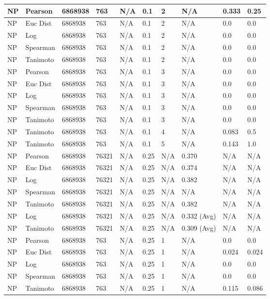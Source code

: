 \documentclass{article}
\begin{document}
\begin{longtable}{ |p{1.7cm}|p{1.9cm}|p{1.5cm}|p{1.5cm}|p{0.75cm}|p{0.75cm}|p{0.75cm}|p{0.75cm}|p{1.5cm}|p{1.5cm}|}
    NP & Pearson & 6868938 & 763 & N/A &  0.1 & 2 & N/A & 0.333 & 0.25  \\ \hline
    NP & Euc Dist & 6868938 & 763 & N/A &  0.1 &  2 & N/A &0.0 & 0.0   \\ \hline
    NP & Log & 6868938 & 763 & N/A &  0.1 &  2 & N/A & 0.0 & 0.0 \\ \hline
    NP & Spearman & 6868938 & 763 & N/A &  0.1 &  2 & N/A & 0.0 & 0.0 \\ \hline
    NP & Tanimoto & 6868938 & 763 & N/A &  0.1 &  2 & N/A & 0.0 & 0.0 \\ \hline
    
    NP & Pearson & 6868938 & 763 & N/A &  0.1 & 3 & N/A & 0.0 & 0.0  \\ \hline
    NP & Euc Dist & 6868938 & 763 & N/A &  0.1 & 3  & N/A &0.0 & 0.0   \\ \hline
    NP & Log & 6868938 & 763 & N/A &  0.1 & 3  & N/A & 0.0 & 0.0  \\ \hline
    NP & Spearman & 6868938 & 763 & N/A &  0.1 & 3  & N/A &0.0 & 0.0 \\ \hline
    NP & Tanimoto & 6868938 & 763 & N/A &  0.1 & 3 & N/A & 0.0 & 0.0 \\ \hline
    NP & Tanimoto & 6868938 & 763 & N/A &  0.1 &  4 & N/A & 0.083 & 0.5 \\ \hline
    NP & Tanimoto & 6868938 & 763 & N/A &  0.1 &  5 & N/A & 0.143 & 1.0 \\ \hline
    
    NP & Pearson & 6868938 & 76321 & N/A &  0.25 & N/A & 0.370 & N/A & N/A  \\ \hline
    NP & Euc Dist & 6868938 & 76321 & N/A &  0.25 & N/A & 0.374 & N/A & N/A   \\ \hline
    NP & Log & 6868938 & 76321 & N/A &  0.25 & N/A & 0.382 & N/A & N/A  \\ \hline
    NP & Spearman & 6868938 & 76321 & N/A &  0.25 & N/A & N/A & N/A & N/A \\ \hline
    NP & Tanimoto & 6868938 & 76321 & N/A &  0.25 & N/A & 0.382 & N/A & N/A \\ \hline
    NP & Log & 6868938 & 76321 & N/A &  0.25 & N/A & 0.332 (Avg) & N/A & N/A \\ \hline
    NP & Tanimoto & 6868938 & 76321 & N/A &  0.25 & N/A & 0.309 (Avg) & N/A & N/A \\ \hline
    
    NP & Pearson & 6868938 & 763 & N/A &  0.25 & 1 & N/A & 0.0 & 0.0  \\ \hline
    NP & Euc Dist & 6868938 & 763 & N/A &  0.25 & 1 & N/A &0.024 & 0.024   \\ \hline
    NP & Log & 6868938 & 763 & N/A &  0.25 & 1 & N/A & 0.0 & 0.0  \\ \hline
    NP & Spearman & 6868938 & 763 & N/A &  0.25 & 1 & N/A &0.0 & 0.0 \\ \hline
    NP & Tanimoto & 6868938 & 763 & N/A &  0.25 & 1 & N/A & 0.115 & 0.086 \\ \hline
    

\end{longtable}
\end{document}
